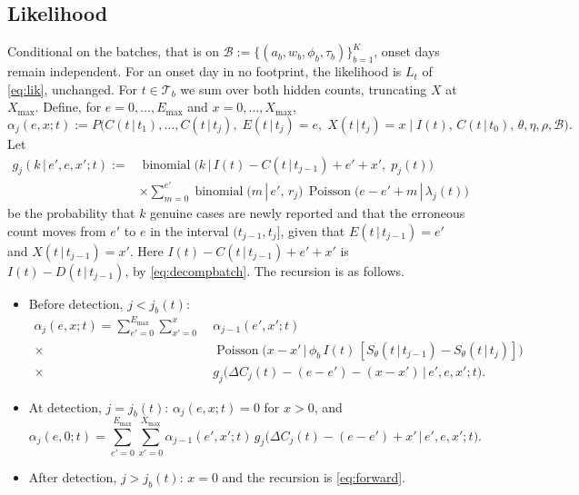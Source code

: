 \documentclass[11pt,a4paper]{article}
\newcommand{\given}{\,|\,}
\newcommand{\bin}{\operatorname{binomial}}
\newcommand{\pois}{\operatorname{Poisson}}
\newcommand{\Emax}{E_{\max}}
\newcommand{\Xmax}{X_{\max}}
\newcommand{\Tb}{\mathcal{T}_b}
\begin{document}
\subsection{Likelihood}

Conditional on the batches, that is on
$\mathcal{B}:=\{(a_b,w_b,\phi_b,\tau_b)\}_{b=1}^{K}$, onset days remain
independent. For an onset day in no footprint, the likelihood is $L_t$ of
\eqref{eq:lik}, unchanged. For $t\in\Tb$ we sum over both hidden counts,
truncating $X$ at $\Xmax$. Define, for $e=0,\dots,\Emax$ and
$x=0,\dots,\Xmax$,
\begin{equation}
\alpha_j(e,x;t) := P\bigl(C(t\given t_1),\dots,C(t\given t_j),\;
E(t\given t_j)=e,\;X(t\given t_j)=x
\;\big|\; I(t),\, C(t\given t_0),\, \theta,\eta,\rho,\mathcal{B}\bigr).
\end{equation}
Let
\begin{equation}\label{eq:g}
\begin{aligned}
g_j(k\given e',e,x';t) := {}&
\bin\bigl(k\given I(t)-C(t\given t_{j-1})+e'+x',\;p_j(t)\bigr)\\
&\times\sum_{m=0}^{e'}\bin\bigl(m\given e',\,r_j\bigr)\,
\pois\bigl(e-e'+m\given\lambda_j(t)\bigr)
\end{aligned}
\end{equation}
be the probability that $k$ genuine cases are newly reported and that the
erroneous count moves from $e'$ to $e$ in the interval $(t_{j-1},t_j]$, given
that $E(t\given t_{j-1})=e'$ and $X(t\given t_{j-1})=x'$. Here
$I(t)-C(t\given t_{j-1})+e'+x'$ is $I(t)-D(t\given t_{j-1})$, by
\eqref{eq:decompbatch}. The recursion is as follows.
\begin{itemize}[itemsep=2pt]
\item Before detection, $j<j_b(t)$:
\begin{equation}\label{eq:forwardbatch}
\begin{aligned}
\alpha_j(e,x;t)=\sum_{e'=0}^{\Emax}\sum_{x'=0}^{x}\;&\alpha_{j-1}(e',x';t)\\
\times\;&\pois\bigl(x-x'\given\phi_b\, I(t)\,[S_\theta(t\given t_{j-1})-S_\theta(t\given t_j)]\bigr)\\
\times\;&g_j\bigl(\Delta C_j(t)-(e-e')-(x-x')\given e',e,x';t\bigr).
\end{aligned}
\end{equation}
\item At detection, $j=j_b(t)$: $\alpha_j(e,x;t)=0$ for $x>0$, and
\begin{equation}\label{eq:forwarddetect}
\alpha_j(e,0;t)=\sum_{e'=0}^{\Emax}\sum_{x'=0}^{\Xmax}\alpha_{j-1}(e',x';t)\,
g_j\bigl(\Delta C_j(t)-(e-e')+x'\given e',e,x';t\bigr).
\end{equation}
\item After detection, $j>j_b(t)$: $x=0$ and the recursion is
\eqref{eq:forward}.
\end{itemize}
\end{document}
